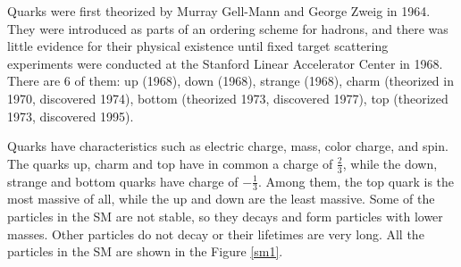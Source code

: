 Quarks were first theorized by Murray Gell-Mann and 
George Zweig in 1964. They were introduced as parts of an ordering scheme for hadrons, and there was little evidence for their physical existence until fixed target scattering experiments were conducted at the Stanford Linear Accelerator Center in 1968\cite{griff}.
There are 6 of them: up (1968), down (1968), strange (1968), charm (theorized in 1970, discovered 1974), bottom (theorized 1973, discovered 1977), top (theorized 1973, discovered 1995).

Quarks have characteristics such as electric charge, mass, color charge, and spin. The quarks up, charm and top have in common a charge of $\frac{2}{3}$, while the down, strange and bottom quarks have charge of $-\frac{1}{3}$. Among them, the top quark is the most massive of all, while the up and down are the least massive. 
Some of the particles in the SM are not stable, so they decays and form particles with lower masses. Other particles do not decay or their lifetimes are very long. All the particles in the SM are shown in the Figure \ref{sm1}. %

